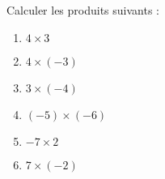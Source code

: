 
\begin{exercice}\label{exosmath-0743}

    Calculer les produits suivants :
    \begin{multicols}{2}
    \begin{enumerate}
        \item
            \( 4\times 3\)
        \item
            \( 4\times (-3)\)
        \item
            \( 3\times (-4)\)
        \item
            \(  (-5)\times (-6)  \)
        \item
            \( -7\times 2\)
        \item
            \( 7\times (-2)\)
    \end{enumerate}
    \end{multicols}
    
\end{exercice}
